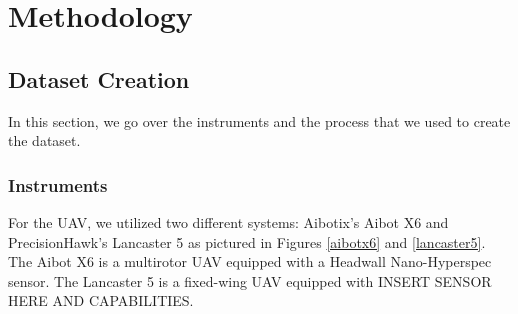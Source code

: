 \chapter{Methodology}


\section{Dataset Creation}
In this section, we go over the instruments and the process that we used to create the dataset.

\subsection{Instruments}
For the UAV, we utilized two different systems: Aibotix's Aibot X6 and PrecisionHawk's Lancaster 5 as pictured in Figures \ref{aibotx6} and \ref{lancaster5}. The Aibot X6 is a multirotor UAV equipped with a Headwall Nano-Hyperspec sensor. The Lancaster 5 is a fixed-wing UAV equipped with INSERT SENSOR HERE AND CAPABILITIES.


